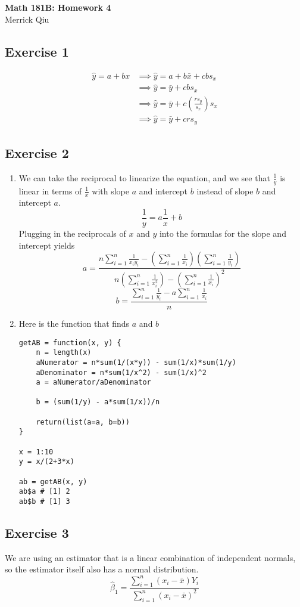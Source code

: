 \documentclass{article}
\newcommand{\sumN}{\sum_{i=1}^{n}}
\begin{document}
\begin{center}
	\huge{\bf Math 181B: Homework 4} \\
	Merrick Qiu 
\end{center}
\subsection*{Exercise 1}
\begin{align*}
	\hat{y} = a+bx &\implies  \hat{y} = a + b\bar{x} + cbs_x \\
	&\implies \hat{y} = \bar{y} + cbs_x \\
	&\implies \hat{y} = \bar{y} + c\left(\frac{rs_y}{s_x}\right)s_x \\
	&\implies \hat{y} = \bar{y} + crs_y
\end{align*}
\newpage 

\subsection*{Exercise 2}
\begin{enumerate}
	\item We can take the reciprocal to linearize the equation, and we see that 
	$\frac{1}{y}$ is linear in terms of $\frac{1}{x}$ with slope $a$ and intercept $b$
	instead of slope $b$ and intercept $a$.
	\[
		\frac{1}{y} = a\frac{1}{x} + b
	\]
	Plugging in the reciprocals of $x$ and $y$ into the formulas 
	for the slope and intercept yields
	\[
		a = \frac{n\sumN \frac{1}{x_iy_i} - \left(\sumN \frac{1}{x_i}\right)\left(\sumN \frac{1}{y_i}\right)}{n\left(\sumN \frac{1}{x_i^2}\right)-\left(\sumN \frac{1}{x_i}\right)^2}
	\]
	\[
		b = \frac{\sumN \frac{1}{y_i} - a\sumN \frac{1}{x_i}}{n}
	\]
	\item Here is the function that finds $a$ and $b$
	\begin{lstlisting}
getAB = function(x, y) {
	n = length(x)
	aNumerator = n*sum(1/(x*y)) - sum(1/x)*sum(1/y)
	aDenominator = n*sum(1/x^2) - sum(1/x)^2
	a = aNumerator/aDenominator
	
	b = (sum(1/y) - a*sum(1/x))/n
	
	return(list(a=a, b=b))
}
	
x = 1:10
y = x/(2+3*x)

ab = getAB(x, y)
ab$a # [1] 2
ab$b # [1] 3	
	\end{lstlisting}
\end{enumerate}
\newpage 

\subsection*{Exercise 3}
We are using an estimator that is a linear combination of independent normals,
so the estimator itself also has a normal distribution.
\[
	\hat{\beta}_1 = \frac{\sumN (x_i - \bar{x})Y_i}{\sumN (x_i - \bar{x})^2}
\]
\end{document}
